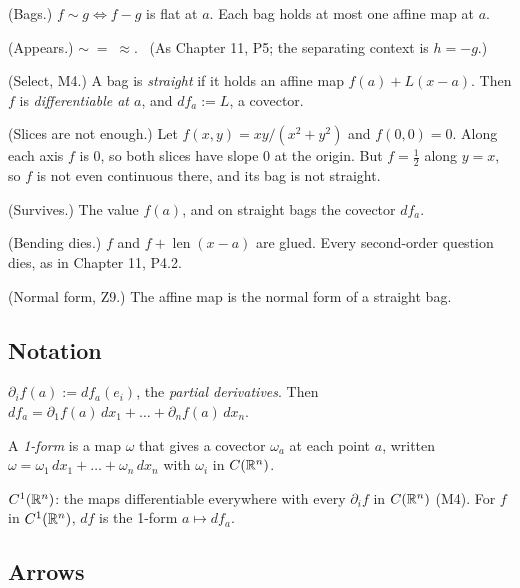 \begin{lines}
\item[\lab{P1}] (Bags.) $f \sim g \iff f - g$ is flat at $a$. Each bag holds at most one affine map at $a$.
\item[\lab{P2}] (Appears.) $\sim \;=\; \approx$. \ (As Chapter 11, P5; the separating context is $h = -g$.)
\item[\lab{P3}] (Select, M4.) A bag is \emph{straight} if it holds an affine map $f(a) + L(x - a)$. Then $f$ is \emph{differentiable at $a$}, and $df_a := L$, a covector.
\item[\lab{P4}] (Slices are not enough.) Let $f(x, y) = xy/(x^2 + y^2)$ and $f(0,0) = 0$. Along each axis $f$ is $0$, so both slices have slope $0$ at the origin. But $f = \tfrac12$ along $y = x$, so $f$ is not even continuous there, and its bag is not straight.
\end{lines}

\begin{lines}
\item[\lab{P5}] (Survives.) The value $f(a)$, and on straight bags the covector $df_a$.
\item[\lab{P6}] (Bending dies.) $f$ and $f + \operatorname{len}(x - a)$ are glued. Every second-order question dies, as in Chapter 11, P4.2.
\item[\lab{P7}] (Normal form, Z9.) The affine map is the normal form of a straight bag.
\end{lines}

\subsection*{Notation}

\begin{lines}
\item[\lab{N1}] $\partial_i f(a) := df_a(e_i)$, the \emph{partial derivatives}. Then $df_a = \partial_1 f(a)\,dx_1 + \dots + \partial_n f(a)\,dx_n$.
\item[\lab{N2}] A \emph{1-form} is a map $\omega$ that gives a covector $\omega_a$ at each point $a$, written $\omega = \omega_1\,dx_1 + \dots + \omega_n\,dx_n$ with $\omega_i$ in $C(\mathbb{R}^n)$.
\item[\lab{N3}] $C^1(\mathbb{R}^n)$: the maps differentiable everywhere with every $\partial_i f$ in $C(\mathbb{R}^n)$ (M4). For $f$ in $C^1(\mathbb{R}^n)$, $df$ is the 1-form $a \mapsto df_a$.
\end{lines}

\subsection*{Arrows}

